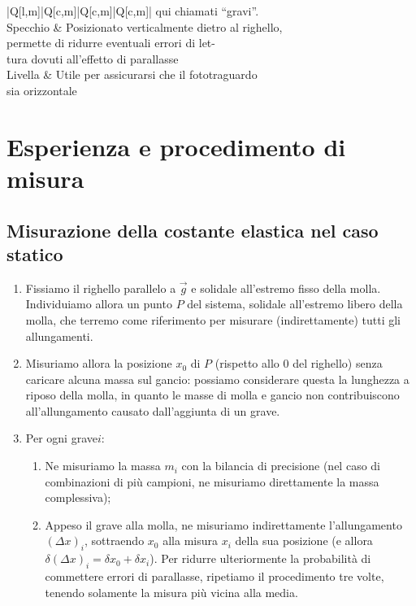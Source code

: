 \documentclass{article}
\begin{document}
\begin{center}
\begin{tblr}{ |Q[l,m]|Q[c,m]|Q[c,m]|Q[c,m]| }
{            qui chiamati “gravi”.
        } \\
        \hline[dashed]
        Specchio &  {
            Posizionato verticalmente dietro al righello, \\
            permette di ridurre eventuali errori di let- \\
            tura dovuti all'effetto di parallasse
        } \\
        \hline[dashed]
        Livella &  {
            Utile per assicurarsi che il fototraguardo \\
            sia orizzontale
        } \\
        \hline
    \end{tblr}
\end{center}

\section{Esperienza e procedimento di misura}
\subsection{Misurazione della costante elastica nel caso statico}
\begin{enumerate}
    \item Fissiamo il righello parallelo a $\vec{g}$ e solidale
          all’estremo fisso della molla.
          Individuiamo allora un punto $P$ del sistema, solidale all’estremo
          libero della molla, che terremo come riferimento per misurare
          (indirettamente) tutti gli allungamenti.
    \item Misuriamo allora la posizione $x_0$ di $P$
          (rispetto allo 0 del righello) senza caricare
          alcuna massa sul gancio: possiamo considerare questa la
          lunghezza a riposo della molla, in quanto le masse di molla
          e gancio non contribuiscono all'allungamento causato
          dall'aggiunta di un grave.
    \item Per ogni grave\footnotemark[1] $i$:
    \begin{enumerate}
        \item Ne misuriamo la massa $m_i$ con la bilancia di precisione
              (nel caso di combinazioni di più campioni, ne misuriamo
              direttamente la massa complessiva);
        \item Appeso il grave alla molla, ne misuriamo indirettamente l'allungamento
        $\left(\Delta x\right)_i$, sottraendo $x_0$ alla misura $x_i$
        della sua posizione (e allora $\delta (\Delta x)_i = \delta x_0 + \delta x_i$).
        Per ridurre ulteriormente la probabilità di commettere errori di parallasse,
        ripetiamo il procedimento tre volte, tenendo solamente la misura più vicina alla media.
    \end{enumerate}
\end{enumerate}
\end{document}
